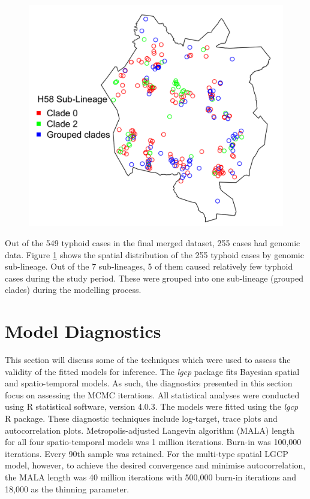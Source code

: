 \begin{figure}[H]
    \begin{center}
        \includegraphics[scale=0.7]{Spatial distribution of typhoid fever in Blantyre by sub-lineage.png}
    \end{center}
     \label{fig:salmonella-genomic-sub-lineage}
\end{figure}

Out of the 549 typhoid cases in the final merged dataset, 255 cases had genomic data.
Figure \ref{fig:salmonella-genomic-sub-lineage} shows the spatial distribution of the 255 typhoid cases by genomic sub-lineage.
Out of the 7 sub-lineages, 5 of them caused relatively few typhoid cases during the study period.
These were grouped into one sub-lineage (grouped clades) during the modelling process.


\section{Model Diagnostics} \label{sec:model-diagnostics}

This section will discuss some of the techniques which were used to assess the validity of the fitted models for inference. 
The \textit{lgcp} package fits Bayesian spatial and spatio-temporal models. 
As such, the diagnostics presented in this section focus on assessing the MCMC iterations. 
All statistical analyses were conducted using R statistical software, version 4.0.3. 
The models were fitted using the \textit{lgcp} R package. 
These diagnostic techniques include log-target, trace plots and autocorrelation plots. 
Metropolis-adjusted Langevin algorithm
(MALA) length for all four spatio-temporal models was 1 million iterations.
Burn-in was 100,000 iterations.
Every 90th sample was retained.
For the multi-type spatial LGCP model, however, to achieve the desired convergence and minimise autocorrelation, the MALA length was 40 million iterations with 500,000 burn-in iterations and 18,000 as the thinning parameter.

